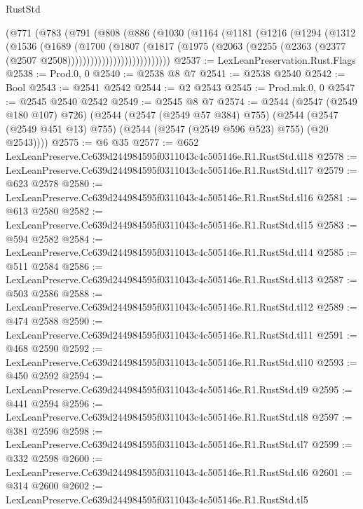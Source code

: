 \begin{lexlean}{RustStd}
\begin{coremodule}
              (@771
                (@783
                  (@791
                    (@808
                      (@886
                        (@1030
                          (@1164
                            (@1181
                              (@1216
                                (@1294
                                  (@1312
                                    (@1536
                                      (@1689
                                        (@1700
                                          (@1807
                                            (@1817
                                              (@1975
                                                (@2063
                                                  (@2255
                                                    (@2363
                                                      (@2377 (@2507 @2508)))))))))))))))))))))))))))
@2537 := LexLeanPreservation.Rust.Flags
@2538 := Prod.{0, 0}
@2540 := @2538 @8 @7
@2541 := @2538 @2540
@2542 := Bool
@2543 := @2541 @2542
@2544 := @2 @2543
@2545 := Prod.mk.{0, 0}
@2547 := @2545 @2540 @2542
@2549 := @2545 @8 @7
@2574 := @2544
    (@2547 (@2549 @180 @107) @726)
    (@2544
      (@2547 (@2549 @57 @384) @755)
      (@2544 (@2547 (@2549 @451 @13) @755) (@2544 (@2547 (@2549 @596 @523) @755) (@20 @2543))))
@2575 := @6 @35
@2577 := @652 LexLeanPreserve.Cc639d244984595f0311043c4c505146e.R1.RustStd.tl18
@2578 := LexLeanPreserve.Cc639d244984595f0311043c4c505146e.R1.RustStd.tl17
@2579 := @623 @2578
@2580 := LexLeanPreserve.Cc639d244984595f0311043c4c505146e.R1.RustStd.tl16
@2581 := @613 @2580
@2582 := LexLeanPreserve.Cc639d244984595f0311043c4c505146e.R1.RustStd.tl15
@2583 := @594 @2582
@2584 := LexLeanPreserve.Cc639d244984595f0311043c4c505146e.R1.RustStd.tl14
@2585 := @511 @2584
@2586 := LexLeanPreserve.Cc639d244984595f0311043c4c505146e.R1.RustStd.tl13
@2587 := @503 @2586
@2588 := LexLeanPreserve.Cc639d244984595f0311043c4c505146e.R1.RustStd.tl12
@2589 := @474 @2588
@2590 := LexLeanPreserve.Cc639d244984595f0311043c4c505146e.R1.RustStd.tl11
@2591 := @468 @2590
@2592 := LexLeanPreserve.Cc639d244984595f0311043c4c505146e.R1.RustStd.tl10
@2593 := @450 @2592
@2594 := LexLeanPreserve.Cc639d244984595f0311043c4c505146e.R1.RustStd.tl9
@2595 := @441 @2594
@2596 := LexLeanPreserve.Cc639d244984595f0311043c4c505146e.R1.RustStd.tl8
@2597 := @381 @2596
@2598 := LexLeanPreserve.Cc639d244984595f0311043c4c505146e.R1.RustStd.tl7
@2599 := @332 @2598
@2600 := LexLeanPreserve.Cc639d244984595f0311043c4c505146e.R1.RustStd.tl6
@2601 := @314 @2600
@2602 := LexLeanPreserve.Cc639d244984595f0311043c4c505146e.R1.RustStd.tl5

\end{coremodule}
\end{lexlean}
